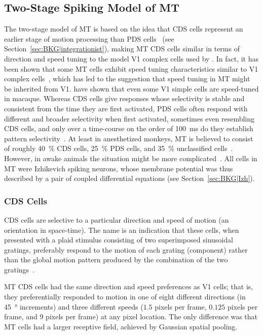\subsection{Two-Stage Spiking Model of MT}
The two-stage model of \ac{MT} is based on the idea that \acf{CDS}
cells represent an earlier stage of motion processing than \acf{PDS}
cells~\citep{Movshon1985,Smith2005} 
(see Section~\ref{sec:BKG|integrationist}), making \ac{MT} \ac{CDS} cells 
similar in terms of direction and speed tuning to the model \ac{V1} 
complex cells used by \cite{SimoncelliHeeger1998}. In fact, it has
been shown that some \ac{MT} cells exhibit speed tuning characteristics
similar to \ac{V1} complex cells~\citep{Priebe2006}, which has led
to the suggestion that speed tuning in \ac{MT} might be inherited
from \ac{V1}. \cite{LivingstoneConway2007} have shown that
even some \ac{V1} simple cells are speed-tuned in macaque.
Whereas \ac{CDS} cells give responses whose selectivity is stable
and consistent from the time they are first activated, \ac{PDS} cells
often respond with different and broader selectivity when first
activated, sometimes even resembling \ac{CDS} cells, and only
over a time-course on the order of \SI{100}{\milli\second}
do they establish
pattern selectivity~\citep{Smith2005}. At least in anesthetized
monkeys, \ac{MT} is believed to consist of roughly \SI{40}{\percent}
\ac{CDS} cells, \SI{25}{\percent} \ac{PDS} cells,
and \SI{35}{\percent} unclassified cells~\citep{Movshon1985}.
However, in awake animals the situation might be
more complicated~\citep{Pack2001}.
All cells in \ac{MT} were Izhikevich spiking neurons, whose
membrane potential was thus described by a pair of coupled
differential equations (see Section~\ref{sec:BKG|Izh}).


\subsubsection{\acf{CDS} Cells}
\label{sec:MT|CDS}

\acf{CDS} cells are selective
to a particular direction and speed of motion (an orientation in
space-time). The name is an indication that these cells, when
presented with a plaid stimulus consisting of two
superimposed sinusoidal gratings, preferably respond to the motion
of each grating (component) rather than the global motion
pattern produced by the combination of the two 
gratings~\citep{Movshon1985}.

\ac{MT} \ac{CDS} cells had the same direction and speed preferences
as \ac{V1} cells; that is, they preferentially responded to
motion in one of eight different directions 
(in \SI{45}{\degree} increments)
and three different speeds ($1.5$ pixels per frame, $0.125$ pixels
per frame, and $9$ pixels per frame) at any pixel location.
The only difference was that \ac{MT} cells had a larger receptive field,
achieved by Gaussian spatial pooling.

